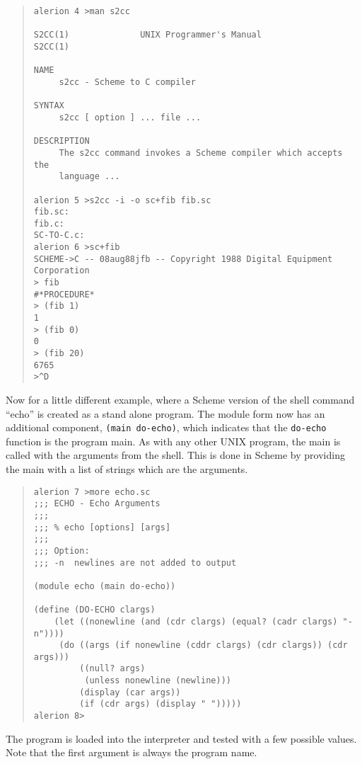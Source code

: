 \documentclass[11pt]{article}
\begin{document}
\begin{small}
\begin{quote}
\begin{verbatim}
alerion 4 >man s2cc

S2CC(1)              UNIX Programmer's Manual               S2CC(1)

NAME
     s2cc - Scheme to C compiler

SYNTAX
     s2cc [ option ] ... file ...

DESCRIPTION
     The s2cc command invokes a Scheme compiler which accepts the
     language ...

alerion 5 >s2cc -i -o sc+fib fib.sc
fib.sc:
fib.c:
SC-TO-C.c:
alerion 6 >sc+fib
SCHEME->C -- 08aug88jfb -- Copyright 1988 Digital Equipment Corporation
> fib
#*PROCEDURE*
> (fib 1)
1
> (fib 0)
0
> (fib 20)
6765
>^D
\end{verbatim}
\end{quote}
\end{small}

Now for a little different example, where a Scheme version of the
shell command ``echo'' is created as a stand alone program. The module
form now has an additional component, \texttt{(main do-echo)}, which
indicates that the \texttt{do-echo} function is the program main. As with
any other UNIX program, the main is called with the arguments from
the shell.  This is done in Scheme by providing the main with a list
of strings which are the arguments.

\begin{small}
\begin{quote}
\begin{verbatim}
alerion 7 >more echo.sc
;;; ECHO - Echo Arguments
;;;
;;; % echo [options] [args]
;;;
;;; Option:
;;;	-n	newlines are not added to output

(module echo (main do-echo))

(define (DO-ECHO clargs)
    (let ((nonewline (and (cdr clargs) (equal? (cadr clargs) "-n"))))
	 (do ((args (if nonewline (cddr clargs) (cdr clargs)) (cdr args)))
	     ((null? args)
	      (unless nonewline (newline)))
	     (display (car args))
	     (if (cdr args) (display " ")))))
alerion 8>
\end{verbatim}
\end{quote}
\end{small}

The program is loaded into the interpreter and tested with a few
possible values.  Note that the first argument is always the program
name.
\end{document}
